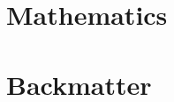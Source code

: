 
\frontmatter
\maketitle

\tableofcontents
\listofpuzzles

\mainmatter
\vfill\eject




\part{Mathematics}



\backmatter
\part*{Backmatter}

\nocite{*}




